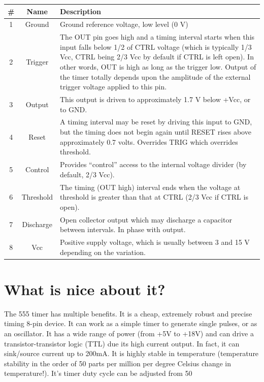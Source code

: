 \documentclass[12pt]{extarticle}
\begin{document}
\begin{center}
\begin{tabular}{|c|c|p{10cm}|}
\hline
\textbf{\#} & \textbf{Name} & \textbf{Description}\\
\hline
1 & Ground & Ground reference voltage, low level (0 V)\\
\hline
2 & Trigger & The OUT pin goes high and a timing interval starts when this input falls below 1/2 of CTRL voltage (which is typically 1/3 Vcc, CTRL being 2/3 Vcc by default if CTRL is left open). In other words, OUT is high as long as the trigger low. Output of the timer totally depends upon the amplitude of the external trigger voltage applied to this pin.\\
\hline
3 & Output & This output is driven to approximately 1.7 V below +Vcc, or to GND.\\
\hline
4 & Reset & A timing interval may be reset by driving this input to GND, but the timing does not begin again until RESET rises above approximately 0.7 volts. Overrides TRIG which overrides threshold.\\
\hline
5 & Control & Provides “control” access to the internal voltage divider (by default, 2/3 Vcc).\\
\hline
6 & Threshold & The timing (OUT high) interval ends when the voltage at threshold is greater than that at CTRL (2/3 Vcc if CTRL is open).\\
\hline
7 & Discharge & Open collector output which may discharge a capacitor between intervals. In phase with output.\\
\hline
8 & Vcc & Positive supply voltage, which is usually between 3 and 15 V depending on the variation.\\
\hline
\end{tabular}
\end{center}
\section{What is nice about it?}
The 555 timer has multiple benefits. It is a cheap, extremely robust and precise timing 8-pin device. It can work as a simple timer to generate single pulses, or as an oscillator. It has a wide range of power (from +5V to +18V) and can drive a transistor-transistor logic (TTL) due its high current output. In fact, it can sink/source current up to 200mA. It is highly stable in temperature (temperature stability in the order of 50 parts per million per degree Celsius change in temperature!). It's timer duty cycle can be adjusted from 50%
\end{document}
